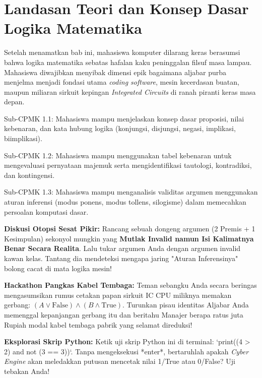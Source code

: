 \documentclass[../main]{subfiles}
\begin{document}
\chapter{Landasan Teori dan Konsep Dasar Logika Matematika}

Setelah menamatkan bab ini, mahasiswa komputer dilarang keras berasumsi bahwa logika matematika sebatas hafalan kaku peninggalan filsuf masa lampau. Mahasiswa diwajibkan menyibak dimensi epik bagaimana aljabar purba menjelma menjadi fondasi utama \textit{coding software}, mesin kecerdasan buatan, maupun miliaran sirkuit kepingan \textit{Integrated Circuits} di ranah piranti keras masa depan.

\begin{subcpmk}
  \item Sub-CPMK 1.1: Mahasiswa mampu menjelaskan konsep dasar proposisi, nilai kebenaran, dan kata hubung logika (konjungsi, disjungsi, negasi, implikasi, biimplikasi).
  \item Sub-CPMK 1.2: Mahasiswa mampu menggunakan tabel kebenaran untuk mengevaluasi pernyataan majemuk serta mengidentifikasi tautologi, kontradiksi, dan kontingensi.
  \item Sub-CPMK 1.3: Mahasiswa mampu menganalisis validitas argumen menggunakan aturan inferensi (modus ponens, modus tollens, silogisme) dalam memecahkan persoalan komputasi dasar.
\end{subcpmk}









\begin{aktivitas}
  \item \textbf{Diskusi Otopsi Sesat Pikir:} Rancang sebuah dongeng argumen (2 Premis + 1 Kesimpulan) sekonyol mungkin yang \textbf{Mutlak Invalid namun Isi Kalimatnya Benar Secara Realita}. Lalu tukar argumen Anda dengan argumen invalid kawan kelas. Tantang dia mendeteksi mengapa jaring "Aturan Inferensinya" bolong cacat di mata logika mesin!
  \item \textbf{Hackathon Pangkas Kabel Tembaga:} Teman sebangku Anda secara beringas mengasumsikan rumus cetakan papan sirkuit IC CPU miliknya memakan gerbang: $(A \lor \text{False}) \land (B \land \text{True})$. Turunkan pisau identitas Aljabar Anda memenggal kepanjangan gerbang itu dan beritahu Manajer berapa ratus juta Rupiah modal kabel tembaga pabrik yang selamat direduksi!
  \item \textbf{Eksplorasi Skrip Python:} Ketik uji skrip Python ini di terminal: `print((4 > 2) and not (3 == 3))`. Tanpa mengeksekusi *enter*, bertaruhlah apakah \textit{Cyber Engine} akan meledakkan putusan mencetak nilai 1/True atau 0/False? Uji tebakan Anda!
\end{aktivitas}
\end{document}
